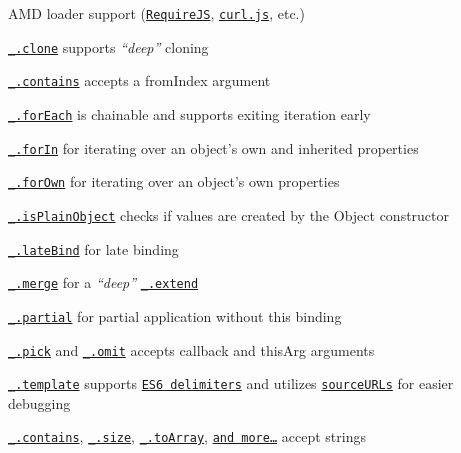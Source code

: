 \begin{DoxyItemize}
\item A\+MD loader support (\href{http://requirejs.org/}{\tt Require\+JS}, \href{https://github.com/cujojs/curl}{\tt curl.\+js}, etc.)
\item \href{http://lodash.com/docs#clone}{\tt \+\_\+.\+clone} supports {\itshape “deep”} cloning
\item \href{http://lodash.com/docs#contains}{\tt \+\_\+.\+contains} accepts a {\ttfamily from\+Index} argument
\item \href{http://lodash.com/docs#forEach}{\tt \+\_\+.\+for\+Each} is chainable and supports exiting iteration early
\item \href{http://lodash.com/docs#forIn}{\tt \+\_\+.\+for\+In} for iterating over an object’s own and inherited properties
\item \href{http://lodash.com/docs#forOwn}{\tt \+\_\+.\+for\+Own} for iterating over an object’s own properties
\item \href{http://lodash.com/docs#isPlainObject}{\tt \+\_\+.\+is\+Plain\+Object} checks if values are created by the {\ttfamily Object} constructor
\item \href{http://lodash.com/docs#lateBind}{\tt \+\_\+.\+late\+Bind} for late binding
\item \href{http://lodash.com/docs#merge}{\tt \+\_\+.\+merge} for a {\itshape “deep”} \href{http://lodash.com/docs#extend}{\tt \+\_\+.\+extend}
\item \href{http://lodash.com/docs#partial}{\tt \+\_\+.\+partial} for partial application without {\ttfamily this} binding
\item \href{http://lodash.com/docs#pick}{\tt \+\_\+.\+pick} and \href{http://lodash.com/docs#omit}{\tt \+\_\+.\+omit} accepts {\ttfamily callback} and {\ttfamily this\+Arg} arguments
\item \href{http://lodash.com/docs#template}{\tt \+\_\+.\+template} supports \href{http://people.mozilla.org/~jorendorff/es6-draft.html#sec-7.8.6}{\tt E\+S6 delimiters} and utilizes \href{http://www.html5rocks.com/en/tutorials/developertools/sourcemaps/#toc-sourceurl}{\tt source\+U\+R\+Ls} for easier debugging
\item \href{http://lodash.com/docs#contains}{\tt \+\_\+.\+contains}, \href{http://lodash.com/docs#size}{\tt \+\_\+.\+size}, \href{http://lodash.com/docs#toArray}{\tt \+\_\+.\+to\+Array}, \href{http://lodash.com/docs}{\tt and more…} accept strings
\end{DoxyItemize}

